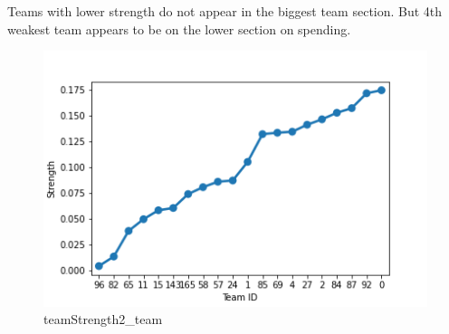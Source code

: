 Teams with lower strength do not appear in the biggest team section. But 4th weakest team appears to be on the lower section on spending.
\begin{figure}[H]
\includegraphics[scale=0.85]{img/Graphs/team/teamStrength2_team.png}
\centering
\caption{teamStrength2\_team}
\label{fig:teamStrength2_team}
\end{figure}